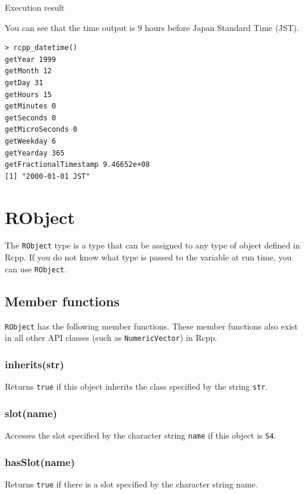 \documentclass[
]{book}
\begin{document}
Execution result

You can see that the time output is 9 hours before Japan Standard Time (JST).

\begin{verbatim}
> rcpp_datetime()
getYear 1999
getMonth 12
getDay 31
getHours 15
getMinutes 0
getSeconds 0
getMicroSeconds 0
getWeekday 6
getYearday 365
getFractionalTimestamp 9.46652e+08
[1] "2000-01-01 JST"
\end{verbatim}

\hypertarget{robject}{%
\chapter{RObject}\label{robject}}

The \texttt{RObject} type is a type that can be assigned to any type of object defined in Rcpp. If you do not know what type is passed to the variable at run time, you can use \texttt{RObject}.

\hypertarget{member-functions}{%
\section{Member functions}\label{member-functions}}

\texttt{RObject} has the following member functions. These member functions also exist in all other API classes (such as \texttt{NumericVector}) in Rcpp.

\hypertarget{inheritsstr}{%
\subsection{inherits(str)}\label{inheritsstr}}

Returns \texttt{true} if this object inherits the class specified by the string \texttt{str}.

\hypertarget{slotname}{%
\subsection{slot(name)}\label{slotname}}

Accesses the slot specified by the character string \texttt{name} if this object is \texttt{S4}.

\hypertarget{hasslotname}{%
\subsection{hasSlot(name)}\label{hasslotname}}

Returns \texttt{true} if there is a slot specified by the character string name.
\end{document}
